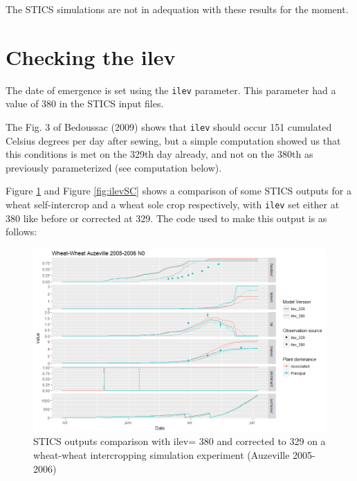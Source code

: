 \documentclass[
]{book}
\begin{document}
The STICS simulations are not in adequation with these results for the moment.

\hypertarget{checking-the-ilev}{%
\section{Checking the ilev}\label{checking-the-ilev}}

The date of emergence is set using the \texttt{ilev} parameter. This parameter had a value of 380 in the STICS input files.

The Fig. 3 of Bedoussac (2009) shows that \texttt{ilev} should occur 151 cumulated Celsius degrees per day after sewing, but a simple computation showed us that this conditions is met on the 329th day already, and not on the 380th as previously parameterized (see computation below).

Figure \ref{fig:ilevIC} and Figure \ref{fig:ilevSC} shows a comparison of some STICS outputs for a wheat self-intercrop and a wheat sole crop respectively, with \texttt{ilev} set either at 380 like before or corrected at 329. The code used to make this output is as follows:

\begin{figure}
\centering
\includegraphics{img/ilev.png}
\caption{\label{fig:ilevIC}STICS outputs comparison with ilev= 380 and corrected to 329 on a wheat-wheat intercropping simulation experiment (Auzeville 2005-2006)}
\end{figure}
\end{document}

